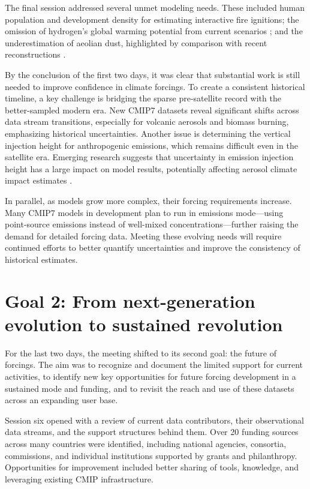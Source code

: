 \documentclass{ametsocV6.1}
\begin{document}
The final session addressed several unmet modeling needs. These included human population and development density for estimating interactive fire ignitions; the omission of hydrogen’s global warming potential from current scenarios \citep[e.g.,][]{sand_multi-model_2023}; and the underestimation of aeolian dust, highlighted by comparison with recent reconstructions \citep[e.g.,][]{kok_mineral_2023}.

By the conclusion of the first two days, it was clear that substantial work is still needed to improve confidence in climate forcings. To create a consistent historical timeline, a key challenge is bridging the sparse pre-satellite record with the better-sampled modern era. New CMIP7 datasets reveal significant shifts across data stream transitions, especially for volcanic aerosols and biomass burning, emphasizing historical uncertainties. Another issue is determining the vertical injection height for anthropogenic emissions, which remains difficult even in the satellite era. Emerging research suggests that uncertainty in emission injection height has a large impact on model results, potentially affecting aerosol climate impact estimates \citep[e.g.,][]{ahsan_emissions_2023}.

In parallel, as models grow more complex, their forcing requirements increase. Many CMIP7 models in development plan to run in emissions mode—using point-source emissions instead of well-mixed concentrations—further raising the demand for detailed forcing data. Meeting these evolving needs will require continued efforts to better quantify uncertainties and improve the consistency of historical estimates.

\section*{Goal 2: From next-generation evolution to sustained revolution}
For the last two days, the meeting shifted to its second goal: the future of forcings. The aim was to recognize and document the limited support for current activities, to identify new key opportunities for future forcing development in a sustained mode and funding, and to revisit the reach and use of these datasets across an expanding user base.

Session six opened with a review of current data contributors, their observational data streams, and the support structures behind them. Over 20 funding sources across many countries were identified, including national agencies, consortia, commissions, and individual institutions supported by grants and philanthropy. Opportunities for improvement included better sharing of tools, knowledge, and leveraging existing CMIP infrastructure.
\end{document}
